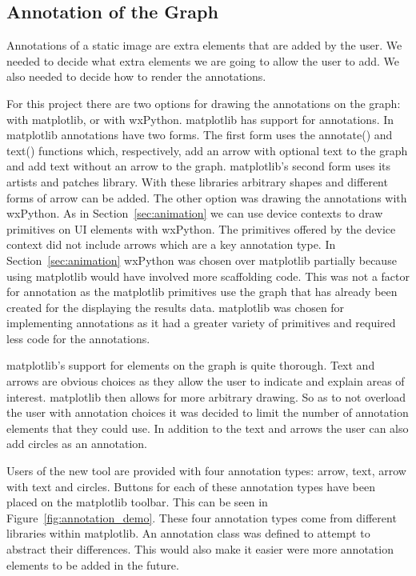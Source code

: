 \subsection{Annotation of the Graph}
\label{sec:annotation_graph}

Annotations of a static image are extra elements that are added by the user.  We needed to decide what extra elements we are going to allow the user to add.  We also needed to decide how to render the annotations.

For this project there are two options for drawing the annotations on the graph: with matplotlib, or with wxPython.  matplotlib has support for annotations.  In matplotlib annotations have two forms. The first form uses the annotate() and text() functions which, respectively, add an arrow with optional text to the graph and add text without an arrow to the graph.  matplotlib's second form uses its artists and patches library.  With these libraries arbitrary shapes and different forms of arrow can be added.  The other option was drawing the annotations with wxPython.  As in Section~\ref{sec:animation} we can use device contexts to draw primitives on \ac{UI} elements with wxPython.  The primitives offered by the device context did not include arrows which are a key annotation type.  In Section~\ref{sec:animation} wxPython was chosen over matplotlib partially because using matplotlib would have involved more scaffolding code.  This was not a factor for annotation as the matplotlib primitives use the graph that has already been created for the displaying the results data.  matplotlib was chosen for implementing annotations as it had a greater variety of primitives and required less code for the annotations.

matplotlib's support for elements on the graph is quite thorough.  Text and arrows are obvious choices as they allow the user to indicate and explain areas of interest.  matplotlib then allows for more arbitrary drawing.  So as to not overload the user with annotation choices it was decided to limit the number of annotation elements that they could use.  In addition to the text and arrows the user can also add circles as an annotation.

Users of the new tool are provided with four annotation types: arrow, text, arrow with text and circles.  Buttons for each of these annotation types have been placed on the matplotlib toolbar.  This can be seen in Figure~\ref{fig:annotation_demo}.  These four annotation types come from different libraries within matplotlib.  An annotation class was defined to attempt to abstract their differences.  This would also make it easier were more annotation elements to be added in the future.

